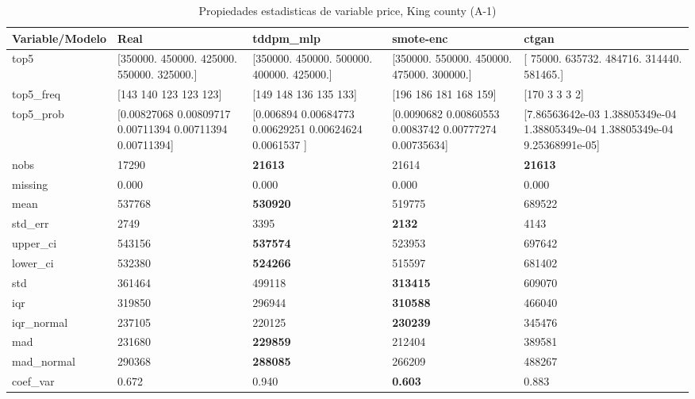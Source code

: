 \begin{table}[H]
\centering
\fontsize{8}{14}\selectfont
\caption{Propiedades  estadisticas de variable price, King county (A-1)}
\label{table-stats-king county-a-1-price}
\begin{tabular}{|l|m{10em}|m{10em}|m{10em}|m{10em}|}
\hline
 \rowcolor[gray]{0.8}
Variable/Modelo & Real & tddpm\_mlp & smote-enc & ctgan \\
\hline top5 & [350000. 450000. 425000. 550000. 325000.] & [350000. 450000. 500000. 400000. 425000.] & [350000. 550000. 450000. 475000. 300000.] & [ 75000. 635732. 484716. 314440. 581465.] \\
\hline top5\_freq & [143 140 123 123 123] & [149 148 136 135 133] & [196 186 181 168 159] & [170   3   3   3   2] \\
\hline top5\_prob & [0.00827068 0.00809717 0.00711394 0.00711394 0.00711394] & [0.006894   0.00684773 0.00629251 0.00624624 0.0061537 ] & [0.0090682  0.00860553 0.0083742  0.00777274 0.00735634] & [7.86563642e-03 1.38805349e-04 1.38805349e-04 1.38805349e-04
 9.25368991e-05] \\
\hline nobs & 17290 & \bfseries 21613 & \cellcolor[rgb]{0.9, 0.54, 0.52} 21614 & \bfseries 21613 \\
\hline missing & 0.000 & 0.000 & 0.000 & 0.000 \\
\hline mean & 537768 & \bfseries 530920 & 519775 & \cellcolor[rgb]{0.9, 0.54, 0.52} 689522 \\
\hline std\_err & 2749 & 3395 & \bfseries 2132 & \cellcolor[rgb]{0.9, 0.54, 0.52} 4143 \\
\hline upper\_ci & 543156 & \bfseries 537574 & 523953 & \cellcolor[rgb]{0.9, 0.54, 0.52} 697642 \\
\hline lower\_ci & 532380 & \bfseries 524266 & 515597 & \cellcolor[rgb]{0.9, 0.54, 0.52} 681402 \\
\hline std & 361464 & 499118 & \bfseries 313415 & \cellcolor[rgb]{0.9, 0.54, 0.52} 609070 \\
\hline iqr & 319850 & 296944 & \bfseries 310588 & \cellcolor[rgb]{0.9, 0.54, 0.52} 466040 \\
\hline iqr\_normal & 237105 & 220125 & \bfseries 230239 & \cellcolor[rgb]{0.9, 0.54, 0.52} 345476 \\
\hline mad & 231680 & \bfseries 229859 & 212404 & \cellcolor[rgb]{0.9, 0.54, 0.52} 389581 \\
\hline mad\_normal & 290368 & \bfseries 288085 & 266209 & \cellcolor[rgb]{0.9, 0.54, 0.52} 488267 \\
\hline coef\_var & 0.672 & \cellcolor[rgb]{0.9, 0.54, 0.52} 0.940 & \bfseries 0.603 & 0.883 \\

\end{tabular}
\end{table}
